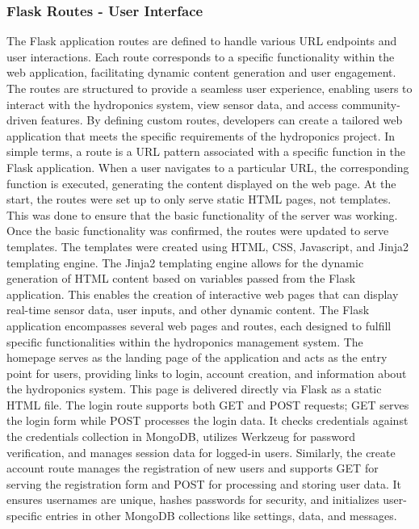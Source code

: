 \documentclass[12pt]{article} %
\begin{document}
\subsubsection{Flask Routes - User Interface}
\noindent The Flask application routes are defined to handle various URL endpoints and user interactions. Each route corresponds to a specific functionality within the web application, facilitating dynamic content generation and user engagement. The routes are structured to provide a seamless user experience, enabling users to interact with the hydroponics system, view sensor data, and access community-driven features. By defining custom routes, developers can create a tailored web application that meets the specific requirements of the hydroponics project.
In simple terms, a route is a URL pattern associated with a specific function in the Flask application. When a user navigates to a particular URL, the corresponding function is executed, generating the content displayed on the web page.
\newline
\newline
\noindent At the start, the routes were set up to only serve static HTML pages, not templates. This was done to ensure that the basic functionality of the server was working. Once the basic functionality was confirmed, the routes were updated to serve templates. The templates were created using HTML, CSS, Javascript, and Jinja2 templating engine. The Jinja2 templating engine allows for the dynamic generation of HTML content based on variables passed from the Flask application. This enables the creation of interactive web pages that can display real-time sensor data, user inputs, and other dynamic content.
\newline
\newline
\noindent The Flask application encompasses several web pages and routes, each designed to fulfill specific functionalities within the hydroponics management system. The homepage serves as the landing page of the application and acts as the entry point for users, providing links to login, account creation, and information about the hydroponics system. This page is delivered directly via Flask as a static HTML file.
\newline
\newline
\noindent The login route supports both GET and POST requests; GET serves the login form while POST processes the login data. It checks credentials against the credentials collection in MongoDB, utilizes Werkzeug for password verification, and manages session data for logged-in users. Similarly, the create account route manages the registration of new users and supports GET for serving the registration form and POST for processing and storing user data. It ensures usernames are unique, hashes passwords for security, and initializes user-specific entries in other MongoDB collections like settings, data, and messages.
\end{document}
